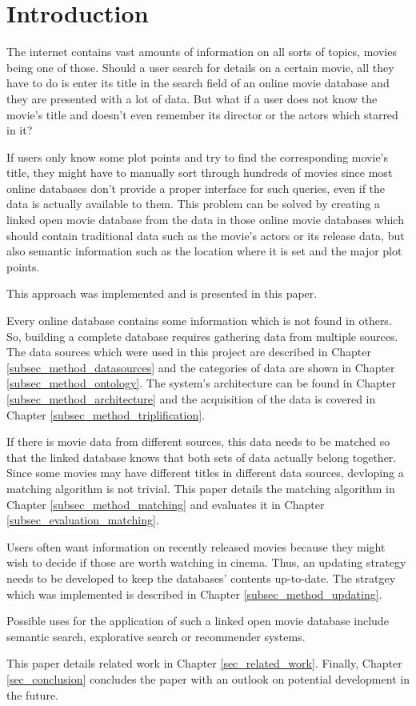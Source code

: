 \section{Introduction}
\label{sec_introduction}

The internet contains vast amounts of information on all sorts of topics, movies being one of those.
Should a user search for details on a certain movie, all they have to do is enter its title in the search field of an online movie database and they are presented with a lot of data.
But what if a user does not know the movie's title and doesn't even remember its director or the actors which starred in it?

If users only know some plot points and try to find the corresponding movie's title, they might have to manually sort through hundreds of movies since most online databases don't provide a proper interface for such queries, even if the data is actually available to them.
This problem can be solved by creating a linked open movie database from the data in those online movie databases which should contain traditional data such as the movie's actors or its release data, but also semantic information such as the location where it is set and the major plot points.

This approach was implemented and is presented in this paper.

Every online database contains some information which is not found in others.
So, building a complete database requires gathering data from multiple sources.
The data sources which were used in this project are described in Chapter \ref{subsec_method_datasources} and the categories of data are shown in Chapter \ref{subsec_method_ontology}.
The system's architecture can be found in Chapter \ref{subsec_method_architecture} and the acquisition of the data is covered in Chapter \ref{subsec_method_triplification}.

If there is movie data from different sources, this data needs to be matched so that the linked database knows that both sets of data actually belong together.
Since some movies may have different titles in different data sources, devloping a matching algorithm is not trivial.
This paper details the matching algorithm in Chapter \ref{subsec_method_matching} and evaluates it in Chapter \ref{subsec_evaluation_matching}.

Users often want information on recently released movies because they might wish to decide if those are worth watching in cinema.
Thus, an updating strategy needs to be developed to keep the databases' contents up-to-date.
The stratgey which was implemented is described in Chapter \ref{subsec_method_updating}.

Possible uses for the application of such a linked open movie database include semantic search, explorative search or recommender systems.

This paper details related work in Chapter \ref{sec_related_work}.
Finally, Chapter \ref{sec_conclusion} concludes the paper with an outlook on potential development in the future.